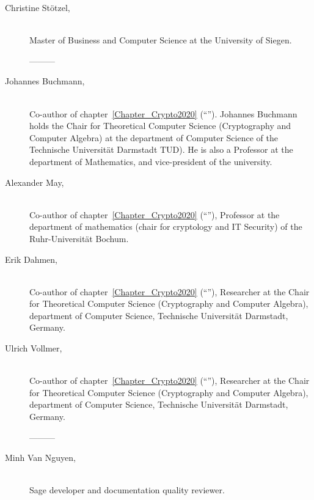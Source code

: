 \begin{description}
\item[Christine St\"otzel,] \mbox{}\\
Master of Business and Computer Science at the University of Siegen.

---------

\item[Johannes Buchmann,] \mbox{}\\
Co-author of chapter~\ref{Chapter_Crypto2020} (``'').
Johannes Buchmann holds the Chair for Theoretical Computer Science (Cryptography
and Computer Algebra) at the department of Computer Science of the Technische
Universit\"at Darmstadt TUD).  He is also a Professor at the department of Mathematics, and vice-president of the university.

\item[Alexander May,] \mbox{}\\
Co-author of chapter~\ref{Chapter_Crypto2020} (``''), 
Professor at the department of mathematics (chair for cryptology and IT Security) of the Ruhr-Universit\"at Bochum.


\item[Erik Dahmen,] \mbox{}\\
Co-author of chapter~\ref{Chapter_Crypto2020} (``''), 
Researcher at the Chair for Theoretical Computer Science (Cryptography and
Computer Algebra), department of Computer Science, Technische Universit\"at
Darmstadt, Germany.

\item[Ulrich Vollmer,] \mbox{}\\
Co-author of chapter~\ref{Chapter_Crypto2020} (``''), 
Researcher at the Chair for Theoretical Computer Science (Cryptography and
Computer Algebra), department of Computer Science, Technische Universit\"at
Darmstadt, Germany.

---------

\item[Minh Van Nguyen,] \mbox{}\\
Sage developer and documentation quality reviewer.



\end{description}

